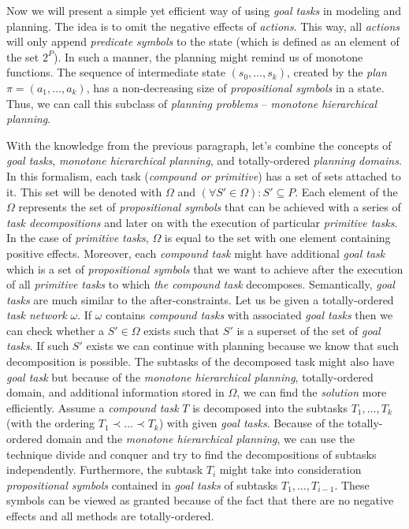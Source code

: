 \medskip\noindent
Now we will present a simple yet efficient way of using \emph{goal tasks} in modeling and planning. The idea is to omit the negative effects of \emph{actions}. This way, all \emph{actions} will only append \emph{predicate symbols} to the state (which is defined as an element of the set $2^P$). In such a manner, the planning might remind us of monotone functions. The sequence of intermediate state $(s_0, \dots, s_k)$, created by the \emph{plan} $\pi = (a_1, \dots, a_k)$, has a non-decreasing size of \emph{propositional symbols} in a state. Thus, we can call this subclass of \emph{planning problems} – \emph{monotone hierarchical planning}.

\medskip\noindent
With the knowledge from the previous paragraph, let's combine the concepts of \emph{goal tasks}, \emph{monotone hierarchical planning}, and totally-ordered \emph{planning domains}. In this formalism, each task (\emph{compound or primitive}) has a set of sets attached to it. This set will be denoted with $\Omega$ and $(\forall S' \in \Omega): S' \subseteq P$. Each element of the $\Omega$ represents the set of \emph{propositional symbols} that can be achieved with a series of \emph{task decompositions} and later on with the execution of particular \emph{primitive tasks}. In the case of \emph{primitive tasks}, $\Omega$ is equal to the set with one element containing positive effects. Moreover, each \emph{compound task} might have additional \emph{goal task} which is a set of \emph{propositional symbols} that we want to achieve after the execution of all \emph{primitive tasks} to which \emph{the compound task} decomposes. Semantically, \emph{goal tasks} are much similar to the after-constraints. Let us be given a totally-ordered \emph{task network} $\omega$. If $\omega$ contains \emph{compound tasks} with associated \emph{goal tasks} then we can check whether a $S' \in \Omega$ exists such that $S'$ is a superset of the set of \emph{goal tasks}. If such $S'$ exists we can continue with planning because we know that such decomposition is possible. The subtasks of the decomposed task might also have \emph{goal task} but because of the \emph{monotone hierarchical planning}, totally-ordered domain, and additional information stored in $\Omega$, we can find the \emph{solution} more efficiently. Assume a \emph{compound task} $T$ is decomposed into the subtasks $T_1, \dots, T_k$ (with the ordering  $T_1 \prec \dots \prec T_k$) with given \emph{goal tasks}. Because of the totally-ordered domain and the \emph{monotone hierarchical planning}, we can use the technique divide and conquer and try to find the decompositions of subtasks independently. Furthermore, the subtask $T_i$ might take into consideration \emph{propositional symbols} contained in \emph{goal tasks} of subtasks $T_1, \dots, T_{i - 1}$. These symbols can be viewed as granted because of the fact that there are no negative effects and all methods are totally-ordered.